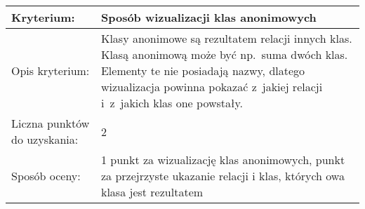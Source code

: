 \begin{longtable}{|m{3cm}|m{10cm}|}\hline
Kryterium:                   & \bf{ Sposób wizualizacji klas anonimowych }\\ \hline
Opis kryterium:              &  Klasy anonimowe są rezultatem relacji innych klas. Klasą anonimową może być np.~suma dwóch klas. 
				Elementy te nie posiadają nazwy, dlatego wizualizacja powinna pokazać z~jakiej relacji i~z~jakich klas one powstały.     \\ \hline
Liczna punktów do uzyskania: &  2  \\ \hline
Sposób oceny:                &  1 punkt za wizualizację klas anonimowych,  \newline 
                                1 punkt za przejrzyste ukazanie relacji i
				klas, których owa klasa jest rezultatem
                                 \\ \hline
                               
\end{longtable}



